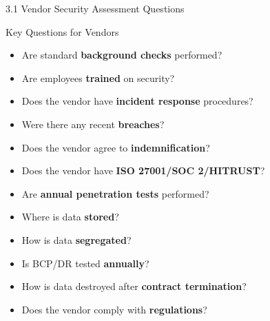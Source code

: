 \documentclass{beamer}
\begin{document}
	\begin{frame}{3.1 Vendor Security Assessment Questions}
		\begin{block}{Key Questions for Vendors}
			\begin{itemize}
				\item Are standard \textbf{background checks} performed?
				\item Are employees \textbf{trained} on security?
				\item Does the vendor have \textbf{incident response} procedures?
				\item Were there any recent \textbf{breaches}?
				\item Does the vendor agree to \textbf{indemnification}?
				\item Does the vendor have \textbf{ISO 27001/SOC 2/HITRUST}?
				\item Are \textbf{annual penetration tests} performed?
				\item Where is data \textbf{stored}?
				\item How is data \textbf{segregated}?
				\item Is BCP/DR tested \textbf{annually}?
				\item How is data destroyed after \textbf{contract termination}?
				\item Does the vendor comply with \textbf{regulations}?
			\end{itemize}
		\end{block}
	\end{frame}
	
\end{document}
